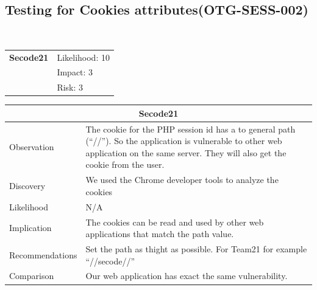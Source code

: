 \documentclass[headsepline,footsepline,footinclude=false,oneside,fontsize=11pt,paper=a4,listof=totoc,bibliography=totoc]{scrbook} %
\begin{document}
\pagebreak
\subsection{Testing for Cookies attributes(OTG-SESS-002)}\

\begin{tabular}{cR{12cm}}
	\textbf{Secode21} & Likelihood: 10\\& Impact: 3\\& Risk: 3
\end{tabular}


\begin{tabular}{ l|p{11cm}  }
	\hline
	\multicolumn{2}{c}{\textbf{Secode21}} \\
	\hline
	Observation &  The cookie for the PHP session id has a to general path (``//''). So
	the application is vulnerable to other web application on the same server. They will
	also get the cookie from the user. \\

	Discovery  & We used the Chrome developer tools to analyze the cookies\\
	Likelihood & N/A\\
	Implication    & The cookies can be read and used by other web applications that
	match the path value. \\
	Recommendations & Set the path as thight as possible. For Team21 for example ``//secode//'' \\
	Comparison& Our web application has exact the same vulnerability.\\
	\hline
\end{tabular}
\\
\vspace{0.5cm}
\\
\end{document}

